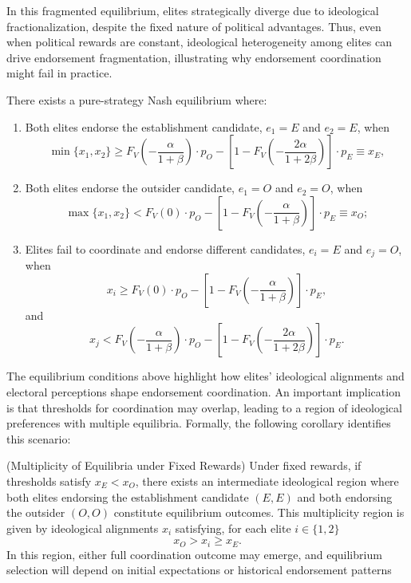 In this fragmented equilibrium, elites strategically diverge due to ideological fractionalization, despite the fixed nature of political advantages. Thus, even when political rewards are constant, ideological heterogeneity among elites can drive endorsement fragmentation, illustrating why endorsement coordination might fail in practice.
\begin{result} There exists a pure-strategy Nash equilibrium where:
\begin{enumerate}
    \item Both elites endorse the establishment candidate, $e_1 = E$ and $e_2 = E$, when
    \[
    \min\{x_1,x_2\} \geq F_V\left(-\frac{\alpha}{1+\beta}\right)\cdot p_O - \left[1- F_V\left(-\frac{2\alpha}{1+2\beta}\right)\right]\cdot p_E \equiv x_E,
    \]

    \item Both elites endorse the outsider candidate, $e_1 = O$ and $e_2 = O$, when
    \[
    \max\{x_1,x_2\} < F_V(0)\cdot p_O - \left[1- F_V\left(-\frac{\alpha}{1+\beta}\right)\right]\cdot p_E \equiv x_O;
    \]

    \item Elites fail to coordinate and endorse different candidates, $e_i = E$ and $e_j = O$, when
    \[
    x_i \geq F_V(0)\cdot p_O - \left[1- F_V\left(-\frac{\alpha}{1+\beta}\right)\right]\cdot p_E,
    \]
    and
    \[
    x_j < F_V\left(-\frac{\alpha}{1+\beta}\right)\cdot p_O - \left[1- F_V\left(-\frac{2\alpha}{1+2\beta}\right)\right]\cdot p_E.
    \]
\end{enumerate}
\end{result}

The equilibrium conditions above highlight how elites' ideological alignments and electoral perceptions shape endorsement coordination. An important implication is that thresholds for coordination may overlap, leading to a region of ideological preferences with multiple equilibria. Formally, the following corollary identifies this scenario:

\begin{corollary}(Multiplicity of Equilibria under Fixed Rewards)
Under fixed rewards, if thresholds satisfy $x_E < x_O$, there exists an intermediate ideological region where both elites endorsing the establishment candidate $(E, E)$ and both endorsing the outsider $(O, O)$ constitute equilibrium outcomes. This multiplicity region is given by ideological alignments $x_i$ satisfying, for each elite $i \in \{1, 2\}$
\[x_O > x_i \geq x_E.\]
In this region, either full coordination outcome may emerge, and equilibrium selection will depend on initial expectations or historical endorsement patterns
\end{corollary}

